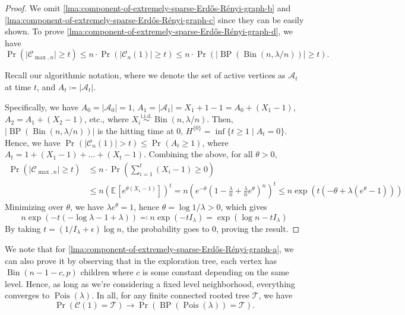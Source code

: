 \begin{proof}
	We omit \autoref{lma:component-of-extremely-sparse-Erdős-Rényi-graph-b} and \autoref{lma:component-of-extremely-sparse-Erdős-Rényi-graph-c} since they can be easily shown. To prove \autoref{lma:component-of-extremely-sparse-Erdős-Rényi-graph-d}, we have
	\[
		\Pr_{}(\lvert \mathcal{C} _{\max , n} \rvert \geq t)
		\leq n \cdot \Pr_{}(\lvert \mathcal{C} _n(1) \rvert \geq t)
		\leq n \cdot \Pr_{}(\lvert \operatorname{BP}(\operatorname{Bin}(n, \lambda / n) )  \rvert \geq t).
	\]

	\begin{notation}
		Recall our algorithmic notation, where we denote the set of active vertices as \(\mathcal{A} _t\) at time \(t\), and \(A_t \coloneqq \lvert \mathcal{A} _t \rvert \).
	\end{notation}

	Specifically, we have \(A_0 = \lvert \mathcal{A} _0 \rvert = 1\), \(A_1 = \lvert \mathcal{A} _1 \rvert = X_1 + 1 - 1 = A_0 + (X_1 - 1)\), \(A_2 = A_1 + (X_2 - 1)\), etc., where \(X_i \overset{\text{i.i.d.} }{\sim } \operatorname{Bin}(n, \lambda / n) \). Then, \(\lvert \operatorname{BP}(\operatorname{Bin}(n, \lambda / n) )  \rvert \) is the hitting time at \(0\), \(H^{\{ 0 \} } = \inf \{ t \geq 1 \mid A_t = 0 \} \). Hence, we have \(\Pr_{}(\lvert \mathcal{C} _n(1) \rvert > t) \leq \Pr_{}(A_t \geq 1)\), where \(A_t = 1 + (X_1 - 1) + \dots  + (X_t - 1)\). Combining the above, for all \(\theta > 0\),
	\[
		\begin{split}
			\Pr_{}(\lvert \mathcal{C} _{\max , n} \rvert \geq t)
			 & \leq n \cdot \Pr_{}\left( \sum_{i=1}^{t} (X_i - 1) \geq 0 \right) \\
			 & \leq n \left( \mathbb{E}_{}[e^{\theta (X_1 - 1)}]  \right) ^t
			= n \left( e^{-\theta } \left( 1 - \frac{\lambda}{n} + \frac{\lambda}{n} e^{\theta } \right)^n \right) ^t
			\leq n \exp (t (-\theta + \lambda (e^\theta - 1)))
		\end{split}
	\]
	Minimizing over \(\theta \), we have \(\lambda e^\theta = 1\), hence \(\theta = \log 1 / \lambda > 0\), which gives
	\[
		n \exp (-t (-\log \lambda - 1 + \lambda ))
		\eqqcolon n \exp (- t I_\lambda )
		= \exp (\log n -t I_\lambda )
	\]
	By taking \(t = (1 / I_\lambda + \epsilon ) \log n\), the probability goes to \(0\), proving the result.
\end{proof}

\begin{note}
	We note that for \autoref{lma:component-of-extremely-sparse-Erdős-Rényi-graph-a}, we can also prove it by observing that in the exploration tree, each vertex has \(\operatorname{Bin}(n-1-c, p) \) children where \(c\) is some constant depending on the same level. Hence, as long as we're considering a fixed level neighborhood, everything converges to \(\operatorname{Pois}(\lambda ) \). In all, for any finite connected rooted tree \(\mathcal{T} \), we have
	\[
		\Pr_{}(\mathcal{C} (1) = \mathcal{T} )  \to \Pr_{}(\operatorname{BP}(\operatorname{Pois}(\lambda ) ) = \mathcal{T} ).
	\]
\end{note}

